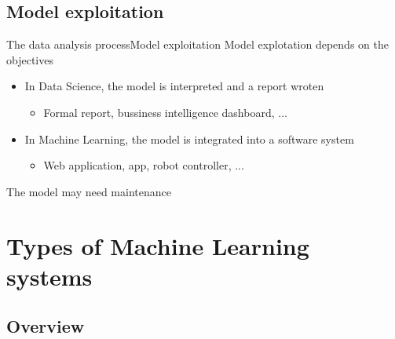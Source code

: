 \documentclass[10pt,compress]{beamer} %
\begin{document}
\subsection{Model exploitation}
\begin{frame}{The data analysis process}{Model exploitation}
	Model explotation depends on the objectives
		\begin{itemize}
		\item In Data Science, the model is interpreted and a report wroten
			\begin{itemize}
				\item Formal report, bussiness intelligence dashboard, ...
			\end{itemize}
		\item In Machine Learning, the model is integrated into a software system
			\begin{itemize}
				\item Web application, app, robot controller, ...
			\end{itemize}
		\end{itemize}
	The model may need maintenance
\end{frame}

\section{Types of Machine Learning systems}
\subsection{Overview}
\end{document}

